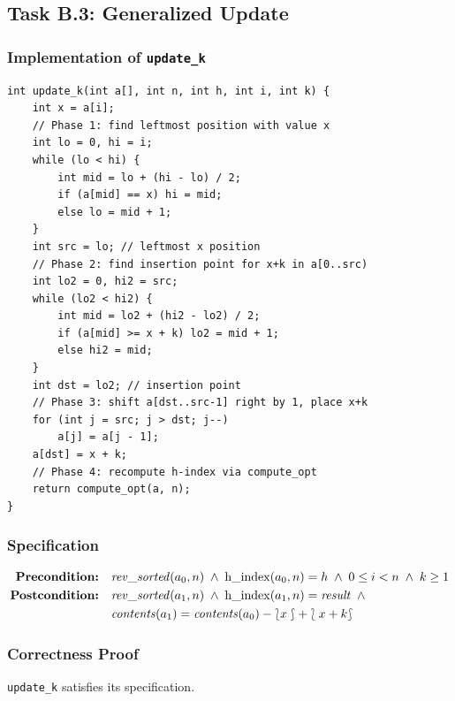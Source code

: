 \subsection{Task B.3: Generalized Update}

\subsubsection{Implementation of \texttt{update\_k}}

\begin{lstlisting}[style=cstyle, caption={Generalized update for $k \geq 1$ citations}]
int update_k(int a[], int n, int h, int i, int k) {
    int x = a[i];
    // Phase 1: find leftmost position with value x
    int lo = 0, hi = i;
    while (lo < hi) {
        int mid = lo + (hi - lo) / 2;
        if (a[mid] == x) hi = mid;
        else lo = mid + 1;
    }
    int src = lo; // leftmost x position
    // Phase 2: find insertion point for x+k in a[0..src)
    int lo2 = 0, hi2 = src;
    while (lo2 < hi2) {
        int mid = lo2 + (hi2 - lo2) / 2;
        if (a[mid] >= x + k) lo2 = mid + 1;
        else hi2 = mid;
    }
    int dst = lo2; // insertion point
    // Phase 3: shift a[dst..src-1] right by 1, place x+k
    for (int j = src; j > dst; j--)
        a[j] = a[j - 1];
    a[dst] = x + k;
    // Phase 4: recompute h-index via compute_opt
    return compute_opt(a, n);
}
\end{lstlisting}

\subsubsection{Specification}

\begin{align*}
  \textbf{Precondition:}\quad &
    \mathit{rev\_sorted}(a_0, n) \;\wedge\;
    \operatorname{h\_index}(a_0, n) = h \;\wedge\;
    0 \leq i < n \;\wedge\; k \geq 1 \\
  \textbf{Postcondition:}\quad &
    \mathit{rev\_sorted}(a_1, n) \;\wedge\;
    \operatorname{h\_index}(a_1, n) = \mathit{result} \;\wedge\; {} \\
    & \mathit{contents}(a_1) = \mathit{contents}(a_0) - \lbag x \rbag + \lbag x+k \rbag
\end{align*}

\subsubsection{Correctness Proof}

\begin{theorem}\label{thm:updatek}
\texttt{update\_k} satisfies its specification.
\end{theorem}

